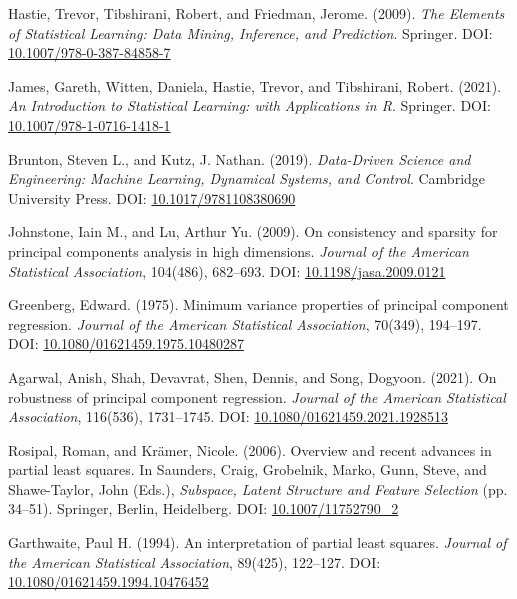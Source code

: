 \documentclass[11pt,twoside,a4paper]{article}
\begin{document}
\begin{thebibliography}{99}

Hastie, Trevor, Tibshirani, Robert, and Friedman, Jerome. (2009). \textit{The Elements of Statistical Learning: Data Mining, Inference, and Prediction}. Springer. DOI: \href{https://doi.org/10.1007/978-0-387-84858-7}{10.1007/978-0-387-84858-7}

James, Gareth, Witten, Daniela, Hastie, Trevor, and Tibshirani, Robert. (2021). \textit{An Introduction to Statistical Learning: with Applications in R}. Springer. DOI: \href{https://doi.org/10.1007/978-1-0716-1418-1}{10.1007/978-1-0716-1418-1}

Brunton, Steven L., and Kutz, J. Nathan. (2019). \textit{Data-Driven Science and Engineering: Machine Learning, Dynamical Systems, and Control}. Cambridge University Press. DOI: \href{https://doi.org/10.1017/9781108380690}{10.1017/9781108380690}

Johnstone, Iain M., and Lu, Arthur Yu. (2009). On consistency and sparsity for principal components analysis in high dimensions. \textit{Journal of the American Statistical Association}, 104(486), 682–693. DOI: \href{https://doi.org/10.1198/jasa.2009.0121}{10.1198/jasa.2009.0121}

Greenberg, Edward. (1975). Minimum variance properties of principal component regression. \textit{Journal of the American Statistical Association}, 70(349), 194–197. DOI: \href{https://doi.org/10.1080/01621459.1975.10480287}{10.1080/01621459.1975.10480287}

Agarwal, Anish, Shah, Devavrat, Shen, Dennis, and Song, Dogyoon. (2021). On robustness of principal component regression. \textit{Journal of the American Statistical Association}, 116(536), 1731–1745. DOI: \href{https://doi.org/10.1080/01621459.2021.1928513}{10.1080/01621459.2021.1928513}

Rosipal, Roman, and Krämer, Nicole. (2006). Overview and recent advances in partial least squares. In Saunders, Craig, Grobelnik, Marko, Gunn, Steve, and Shawe-Taylor, John (Eds.), \textit{Subspace, Latent Structure and Feature Selection} (pp. 34–51). Springer, Berlin, Heidelberg. DOI: \href{https://doi.org/10.1007/11752790_2}{10.1007/11752790\_2}

Garthwaite, Paul H. (1994). An interpretation of partial least squares. \textit{Journal of the American Statistical Association}, 89(425), 122–127. DOI: \href{https://doi.org/10.1080/01621459.1994.10476452}{10.1080/01621459.1994.10476452}


\end{thebibliography}
\end{document}
